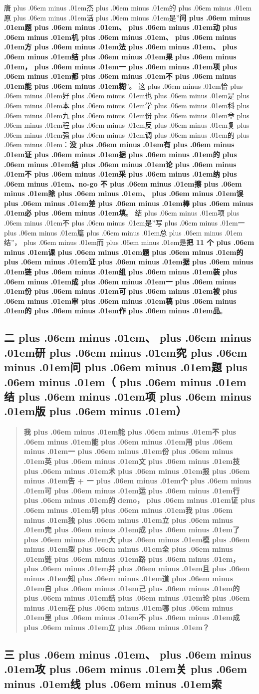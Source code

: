 \documentclass[
]{article}
\def\zh#1{{\zhfont #1}}
\def\zhglue{\hskip0pt plus .06em minus .01em}
\begin{document}
\zh{唐\zhglue 杰\zhglue 的\zhglue 原\zhglue 话\zhglue 是}''\textbf{\zh{问\zhglue 题\zhglue 、\zhglue 动\zhglue 机\zhglue 、\zhglue 方\zhglue 法\zhglue 、\zhglue 结\zhglue 果\zhglue ，\zhglue 一\zhglue 项\zhglue 都\zhglue 不\zhglue 能\zhglue 糊}}''\zh{。} \zh{这\zhglue 恰\zhglue 好\zhglue 也\zhglue 是\zhglue 本\zhglue 学\zhglue 科\zhglue 九\zhglue 份\zhglue 章\zhglue 程\zhglue 反\zhglue 复\zhglue 强\zhglue 调\zhglue 的\zhglue ：}\textbf{\zh{没\zhglue 有\zhglue 证\zhglue 据\zhglue 的\zhglue 结\zhglue 论\zhglue 不\zhglue 采\zhglue 纳\zhglue 、}no-go \zh{不\zhglue 擦\zhglue 除\zhglue 、\zhglue 误\zhglue 差\zhglue 棒\zhglue 必\zhglue 填}}\zh{。} \zh{结\zhglue 项\zhglue 不\zhglue 是}''\zh{写\zhglue 一\zhglue 篇\zhglue 总\zhglue 结}''\zh{，\zhglue 而\zhglue 是}\textbf{\zh{把} 11 \zh{个\zhglue 课\zhglue 题\zhglue 的\zhglue 证\zhglue 据\zhglue 链\zhglue 组\zhglue 装\zhglue 成\zhglue 一\zhglue 份\zhglue 可\zhglue 被\zhglue 审\zhglue 稿\zhglue 的\zhglue 作\zhglue 品}}\zh{。}

\subsection{\zh{二\zhglue 、\zhglue 研\zhglue 究\zhglue 问\zhglue 题\zhglue （\zhglue 结\zhglue 项\zhglue 版\zhglue ）}}\label{ux4e8cux7814ux7a76ux95eeux9898ux7ed3ux9879ux7248}

\begin{quote}
\textbf{\zh{我\zhglue 能\zhglue 不\zhglue 能\zhglue 用\zhglue 一\zhglue 份\zhglue 英\zhglue 文\zhglue 技\zhglue 术\zhglue 报\zhglue 告} + \zh{一\zhglue 个\zhglue 可\zhglue 运\zhglue 行\zhglue 的} demo\zh{，\zhglue 证\zhglue 明\zhglue 我\zhglue 独\zhglue 立\zhglue 完\zhglue 成\zhglue 了\zhglue 大\zhglue 模\zhglue 型\zhglue 全\zhglue 链\zhglue 路\zhglue ，\zhglue 并\zhglue 且\zhglue 知\zhglue 道\zhglue 自\zhglue 己\zhglue 的\zhglue 结\zhglue 论\zhglue 在\zhglue 哪\zhglue 里\zhglue 不\zhglue 成\zhglue 立\zhglue ？}}
\end{quote}

\subsection{\zh{三\zhglue 、\zhglue 攻\zhglue 关\zhglue 线\zhglue 索}}\label{ux4e09ux653bux5173ux7ebfux7d22-9}
\end{document}
